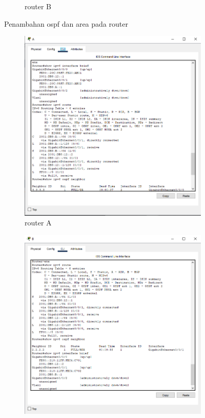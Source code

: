 \begin{figure}[H]
\begin{subfigure}[b]{0.3\linewidth}
      \caption{router B}
    \end{subfigure}
    \caption{Penambahan ospf dan area pada router}
\end{figure}
\begin{figure}[H]
    \centering
    \begin{subfigure}[b]{0.3\linewidth}
      \centering
      \includegraphics[width=\linewidth]{image/cekA.png}
      \caption{router A}
    \end{subfigure}
    \hspace{1cm}
    \begin{subfigure}[b]{0.3\linewidth}
      \centering
      \includegraphics[width=\linewidth]{image/cekB.png}

\end{subfigure}
\end{figure}
